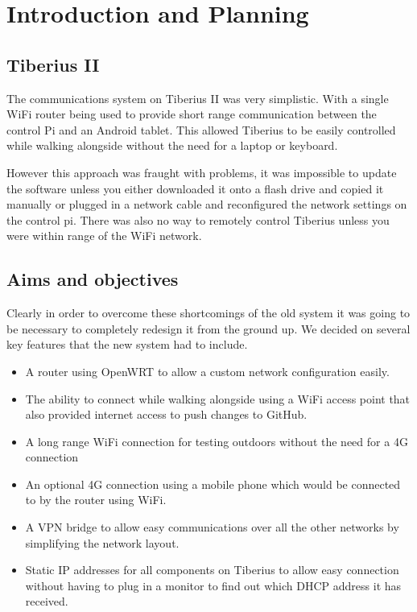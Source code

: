\section{Introduction and Planning}
\subsection{Tiberius II}
The communications system on Tiberius II was very simplistic. With a single WiFi router being used to provide short range communication between the control Pi and an Android tablet. This allowed Tiberius to be easily controlled while walking alongside without the need for a laptop or keyboard.

However this approach was fraught with problems, it was impossible to update the software unless you either downloaded it onto a flash drive and copied it manually or plugged in a network cable and reconfigured the network settings on the control pi. There was also no way to remotely control Tiberius unless you were within range of the WiFi network.



\subsection{Aims and objectives}
Clearly in order to overcome these shortcomings of the old system it was going to be necessary to completely redesign it from the ground up. 
\newline
We decided on several key features that the new system had to include.

\begin{itemize}
\item A router using OpenWRT to allow a custom network configuration easily.
\item The ability to connect while walking alongside using a WiFi access point that also provided internet access to push changes to GitHub.
\item A long range WiFi connection for testing outdoors without the need for a 4G connection
\item An optional 4G connection using a mobile phone which would be connected to by the router using WiFi.
\item A VPN bridge to allow easy communications over all the other networks by simplifying the network layout.
\item Static IP addresses for all components on Tiberius to allow easy connection without having to plug in a monitor to find out which DHCP address it has received.
\end{itemize}

